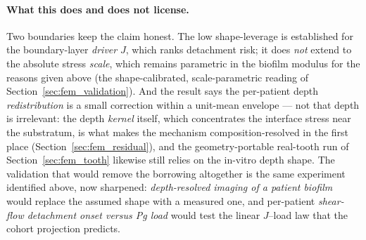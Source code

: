 \paragraph{What this does and does not license.} Two boundaries keep the claim honest.
The low shape-leverage is established for the boundary-layer \emph{driver} $J$, which ranks
detachment risk; it does \emph{not} extend to the absolute stress \emph{scale}, which
remains parametric in the biofilm modulus for the reasons given above (the
shape-calibrated, scale-parametric reading of Section~\ref{sec:fem_validation}). And the
result says the per-patient depth \emph{redistribution} is a small correction within a
unit-mean envelope --- not that depth is irrelevant: the depth \emph{kernel} itself, which
concentrates the interface stress near the substratum, is what makes the mechanism
composition-resolved in the first place (Section~\ref{sec:fem_residual}), and the
geometry-portable real-tooth run of Section~\ref{sec:fem_tooth} likewise still relies on
the in-vitro depth shape. The validation that would remove the borrowing altogether is the
same experiment identified above, now sharpened: \emph{depth-resolved imaging of a patient
biofilm} would replace the assumed shape with a measured one, and per-patient
\emph{shear-flow detachment onset versus Pg load} would test the linear $J$--load law that
the cohort projection predicts.

